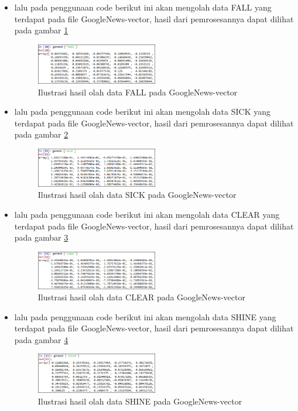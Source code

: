 \begin{enumerate}
\begin{itemize}
\item  lalu pada penggunaan code berikut ini akan mengolah data FALL yang terdapat pada file GoogleNews-vector, hasil dari pemrosesannya dapat dilihat pada gambar \ref{d10}
\begin{figure}[!htbp]
	\centering
	\includegraphics[width=0.5\textwidth]{figures/fathi/chapter5/hari2/4}
	\caption{Ilustrasi hasil olah data FALL pada GoogleNews-vector}
	\label{d10}
\end{figure}

\item  lalu pada penggunaan code berikut ini akan mengolah data SICK yang terdapat pada file GoogleNews-vector, hasil dari pemrosesannya dapat dilihat pada gambar \ref{d11}
\begin{figure}[!htbp]
	\centering
	\includegraphics[width=0.5\textwidth]{figures/fathi/chapter5/hari2/5}
	\caption{Ilustrasi hasil olah data SICK pada GoogleNews-vector}
	\label{d11}
\end{figure}

\item  lalu pada penggunaan code berikut ini akan mengolah data CLEAR yang terdapat pada file GoogleNews-vector, hasil dari pemrosesannya dapat dilihat pada gambar \ref{d12}
\begin{figure}[!htbp]
	\centering
	\includegraphics[width=0.5\textwidth]{figures/fathi/chapter5/hari2/6}
	\caption{Ilustrasi hasil olah data CLEAR pada GoogleNews-vector}
	\label{d12}
\end{figure}

\item  lalu pada penggunaan code berikut ini akan mengolah data SHINE yang terdapat pada file GoogleNews-vector, hasil dari pemrosesannya dapat dilihat pada gambar \ref{d13}
\begin{figure}[!htbp]
	\centering
	\includegraphics[width=0.5\textwidth]{figures/fathi/chapter5/hari2/7}
	\caption{Ilustrasi hasil olah data SHINE pada GoogleNews-vector}
	\label{d13}
\end{figure}


\end{itemize}
\end{enumerate}
